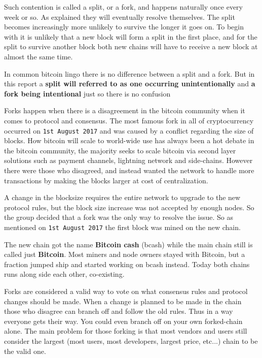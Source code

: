 Such contention is called a split, or a fork, and happens naturally once every week or so. As explained they will eventually resolve themselves. The split becomes increasingly more unlikely to survive the longer it goes on. To begin with it is unlikely that a new block will form a split in the first place, and for the split to survive another block both new chains will have to receive a new block at almost the same time.

In common bitcoin lingo there is no difference between a split and a fork. But in this report a \textbf{split will referred to as one occurring unintentionally} and \textbf{a fork being intentional} just so there is no confusion

Forks happen when there is a disagreement in the bitcoin community when it comes to protocol and consensus. The most famous fork in all of cryptocurrency occurred on \texttt{1st August 2017} and was caused by a conflict regarding the size of blocks. How bitcoin will scale to world-wide use has always been a hot debate in the bitcoin community, the majority seeks to scale bitcoin via second layer solutions such as payment channels, lightning network and side-chains. However there were those who disagreed, and instead wanted the network to handle more transactions by making the blocks larger at cost of centralization. 

A change in the blocksize requires the entire network to upgrade to the new protocol rules, but the block size increase was not accepted by enough nodes. So the group decided that a fork was the only way to resolve the issue. So as mentioned on \texttt{1st August 2017} the first block was mined on the new chain. 

The new chain got the name \textbf{Bitcoin cash} (bcash) while the main chain still is called just \textbf{Bitcoin}. Most miners and node owners stayed with Bitcoin, but a fraction jumped ship and started working on bcash instead. Today both chains runs along side each other, co-existing.

Forks are considered a valid way to vote on what consensus rules and protocol changes should be made. When a change is planned to be made in the chain those who disagree can branch off and follow the old rules. Thus in a way everyone gets their way. You could even branch off on your own forked-chain alone. The main problem for those forking is that most vendors and users still consider the largest (most users, most developers, largest price, etc...) chain to be the valid one. 

